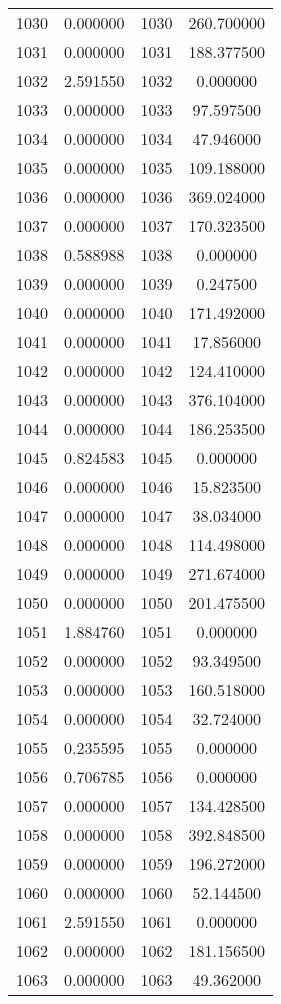 \documentclass[12pt]{article}
\begin{document}
\begin{longtable}{@{}cccc@{}}
1030 & 0.000000 & 1030 & 260.700000 \\
1031 & 0.000000 & 1031 & 188.377500 \\
1032 & 2.591550 & 1032 & 0.000000 \\
1033 & 0.000000 & 1033 & 97.597500 \\
1034 & 0.000000 & 1034 & 47.946000 \\
1035 & 0.000000 & 1035 & 109.188000 \\
1036 & 0.000000 & 1036 & 369.024000 \\
1037 & 0.000000 & 1037 & 170.323500 \\
1038 & 0.588988 & 1038 & 0.000000 \\
1039 & 0.000000 & 1039 & 0.247500 \\
1040 & 0.000000 & 1040 & 171.492000 \\
1041 & 0.000000 & 1041 & 17.856000 \\
1042 & 0.000000 & 1042 & 124.410000 \\
1043 & 0.000000 & 1043 & 376.104000 \\
1044 & 0.000000 & 1044 & 186.253500 \\
1045 & 0.824583 & 1045 & 0.000000 \\
1046 & 0.000000 & 1046 & 15.823500 \\
1047 & 0.000000 & 1047 & 38.034000 \\
1048 & 0.000000 & 1048 & 114.498000 \\
1049 & 0.000000 & 1049 & 271.674000 \\
1050 & 0.000000 & 1050 & 201.475500 \\
1051 & 1.884760 & 1051 & 0.000000 \\
1052 & 0.000000 & 1052 & 93.349500 \\
1053 & 0.000000 & 1053 & 160.518000 \\
1054 & 0.000000 & 1054 & 32.724000 \\
1055 & 0.235595 & 1055 & 0.000000 \\
1056 & 0.706785 & 1056 & 0.000000 \\
1057 & 0.000000 & 1057 & 134.428500 \\
1058 & 0.000000 & 1058 & 392.848500 \\
1059 & 0.000000 & 1059 & 196.272000 \\
1060 & 0.000000 & 1060 & 52.144500 \\
1061 & 2.591550 & 1061 & 0.000000 \\
1062 & 0.000000 & 1062 & 181.156500 \\
1063 & 0.000000 & 1063 & 49.362000 \\

\end{longtable}
\end{document}
